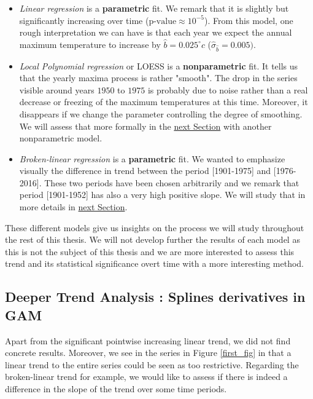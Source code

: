 \begin{itemize}
\item \emph{Linear regression} is a \textbf{parametric} fit. We remark that it is slightly but significantly increasing over time ($\text{p-value}\approx 10^{-5}$). From this model, one rough interpretation we can have is that each year we expect the annual maximum temperature to increase by $\hat{b}=0.025^{\circ}c$ ($\hat{\sigma}_{\hat{b}}=0.005)$.

\item \emph{Local Polynomial regression } or LOESS is a \textbf{nonparametric} fit. It tells us that the yearly maxima process is rather "smooth". The drop in the series visible around years $1950$ to $1975$ is probably due to noise rather than a real decrease or freezing of the maximum temperatures at this time. Moreover, it disappears if we change the parameter controlling the degree of smoothing. We will assess that more formally in the \hyperref[sec:splines]{next Section} with another nonparametric model.

\item \emph{Broken-linear regression} is a \textbf{parametric} fit. We wanted to emphasize visually the difference in trend between the period [1901-1975] and [1976-2016]. These two periods have been chosen arbitrarily and we remark that period [1901-1952] has also a very high positive slope. We will study that in more details in \hyperref[sec:splines]{next Section}.
\end{itemize}
These different models give us insights on the process we will study throughout the rest of this thesis. We will not develop further the results of each model as this is not the subject of this thesis and we are more interested to assess this trend and its statistical significance overt time with a more interesting method.


\subsection{Deeper Trend Analysis : Splines derivatives in GAM}\label{sec:splines}

Apart from the significant pointwise increasing linear trend, we did not find concrete results. Moreover, we see in the series in Figure \ref{first_fig} in that a linear trend to the entire series could be seen as too restrictive. Regarding the broken-linear trend for example, we would like to assess if there is indeed a difference in the slope of the trend over some time periods. 

